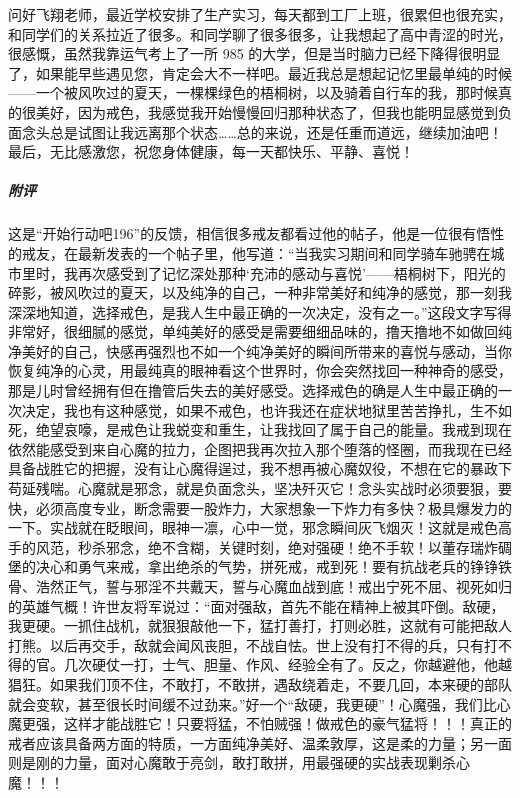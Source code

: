 \begin{case}
    问好飞翔老师，最近学校安排了生产实习，每天都到工厂上班，很累但也很充实，和同学们的关系拉近了很多。和同学聊了很多很多，让我想起了高中青涩的时光，很感慨，虽然我靠运气考上了一所 985 的大学，但是当时脑力已经下降得很明显了，如果能早些遇见您，肯定会大不一样吧。最近我总是想起记忆里最单纯的时候——一个被风吹过的夏天，一棵棵绿色的梧桐树，以及骑着自行车的我，那时候真的很美好，因为戒色，我感觉我开始慢慢回归那种状态了，但我也能明显感觉到负面念头总是试图让我远离那个状态……总的来说，还是任重而道远，继续加油吧！最后，无比感激您，祝您身体健康，每一天都快乐、平静、喜悦！
    \subparagraph{附评} 这是“开始行动吧196”的反馈，相信很多戒友都看过他的帖子，他是一位很有悟性的戒友，在最新发表的一个帖子里，他写道：“当我实习期间和同学骑车驰骋在城市里时，我再次感受到了记忆深处那种‘充沛的感动与喜悦’——梧桐树下，阳光的碎影，被风吹过的夏天，以及纯净的自己，一种非常美好和纯净的感觉，那一刻我深深地知道，选择戒色，是我人生中最正确的一次决定，没有之一。”这段文字写得非常好，很细腻的感觉，单纯美好的感受是需要细细品味的，撸天撸地不如做回纯净美好的自己，快感再强烈也不如一个纯净美好的瞬间所带来的喜悦与感动，当你恢复纯净的心灵，用最纯真的眼神看这个世界时，你会突然找回一种神奇的感受，那是儿时曾经拥有但在撸管后失去的美好感受。选择戒色的确是人生中最正确的一次决定，我也有这种感觉，如果不戒色，也许我还在症状地狱里苦苦挣扎，生不如死，绝望哀嚎，是戒色让我蜕变和重生，让我找回了属于自己的能量。我戒到现在依然能感受到来自心魔的拉力，企图把我再次拉入那个堕落的怪圈，而我现在已经具备战胜它的把握，没有让心魔得逞过，我不想再被心魔奴役，不想在它的暴政下苟延残喘。心魔就是邪念，就是负面念头，坚决歼灭它！念头实战时必须要狠，要快，必须高度专业，断念需要一股炸力，大家想象一下炸力有多快？极具爆发力的一下。实战就在眨眼间，眼神一凛，心中一觉，邪念瞬间灰飞烟灭！这就是戒色高手的风范，秒杀邪念，绝不含糊，关键时刻，绝对强硬！绝不手软！以董存瑞炸碉堡的决心和勇气来戒，拿出绝杀的气势，拼死戒，戒到死！要有抗战老兵的铮铮铁骨、浩然正气，誓与邪淫不共戴天，誓与心魔血战到底！戒出宁死不屈、视死如归的英雄气概！许世友将军说过：“面对强敌，首先不能在精神上被其吓倒。敌硬，我更硬。一抓住战机，就狠狠敲他一下，猛打善打，打则必胜，这就有可能把敌人打熊。以后再交手，敌就会闻风丧胆，不战自怯。世上没有打不得的兵，只有打不得的官。几次硬仗一打，士气、胆量、作风、经验全有了。反之，你越避他，他越猖狂。如果我们顶不住，不敢打，不敢拼，遇敌绕着走，不要几回，本来硬的部队就会变软，甚至很长时间缓不过劲来。”好一个“敌硬，我更硬”！心魔强，我们比心魔更强，这样才能战胜它！只要将猛，不怕贼强！做戒色的豪气猛将！！！真正的戒者应该具备两方面的特质，一方面纯净美好、温柔敦厚，这是柔的力量；另一面则是刚的力量，面对心魔敢于亮剑，敢打敢拼，用最强硬的实战表现剿杀心魔！！！
\end{case}


